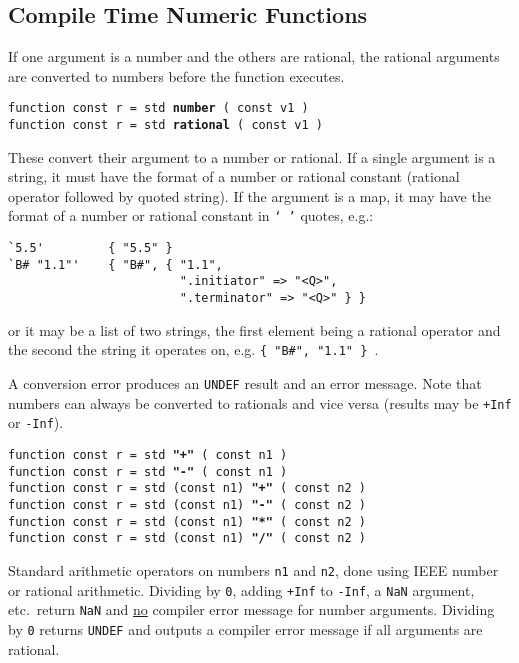 \documentclass[12pt]{article}
\newcommand{\ttkey}[1]{{\tt \bfseries #1}}
\newenvironment{indpar}[1][0.3in]%
	{\begin{list}{}%
		     {\setlength{\itemsep}{0in}%
		      \setlength{\topsep}{0in}%
		      \setlength{\parsep}{1ex}%
		      \setlength{\labelwidth}{#1}%
		      \setlength{\leftmargin}{#1}%
		      \addtolength{\leftmargin}{\labelsep}}%
	 \item}%
	{\end{list}}
\begin{document}
\subsection{Compile Time Numeric Functions}

If one argument is a number and the others are rational,
the rational arguments are converted to numbers before
the function executes.

{\tt function const r = std \ttkey{number} ( const v1 )} \\
{\tt function const r = std \ttkey{rational} ( const v1 )}
\begin{indpar}
These convert their argument to a number or rational.  If
a single argument is a string, it must have the format of
a number or rational constant (rational operator followed
by quoted string).
If the argument is a map, it may have the format of
a number or rational constant in {\tt `~'} quotes, e.g.:
\begin{indpar}\begin{verbatim}
`5.5'         { "5.5" }
`B# "1.1"'    { "B#", { "1.1",
                        ".initiator" => "<Q>",
                        ".terminator" => "<Q>" } }
\end{verbatim}\end{indpar}

or it may be a list of two strings, the first element
being a rational operator and the second
the string it operates on, e.g. {\tt \{ "B\#", "1.1" \} }.

A conversion
error produces an {\tt UNDEF} result and an error message.
Note that numbers can always be converted to rationals
and vice versa (results may be {\tt +Inf} or {\tt -Inf}).
\end{indpar}

{\tt function const r = std \ttkey{"+"} ( const n1 )} \\
{\tt function const r = std \ttkey{"-"} ( const n1 )} \\
{\tt function const r = std (const n1) \ttkey{"+"} ( const n2 )} \\
{\tt function const r = std (const n1) \ttkey{"-"} ( const n2 )} \\
{\tt function const r = std (const n1) \ttkey{"*"} ( const n2 )} \\
{\tt function const r = std (const n1) \ttkey{"/"} ( const n2 )}
\begin{indpar}
Standard arithmetic operators on numbers {\tt n1} and {\tt n2},
done using IEEE number or rational arithmetic.
Dividing by {\tt 0},
adding {\tt +Inf} to {\tt -Inf}, a {\tt NaN} argument, etc.~return
{\tt NaN} and \underline{no} compiler error message for number
arguments.  Dividing by {\tt 0} returns {\tt UNDEF} and outputs a
compiler error message if all arguments are rational.
\end{indpar}
\end{document}
